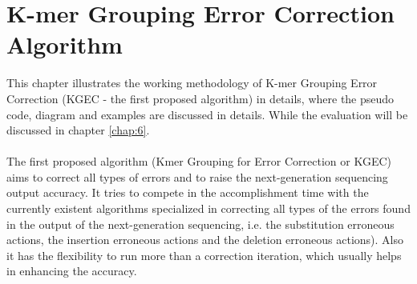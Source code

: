 \documentclass[12pt,openany]{llncs}
\begin{document}
\newpage
\chapter{\label{chap:4}K-mer Grouping Error Correction Algorithm}
This chapter illustrates the working methodology of K-mer Grouping Error Correction (KGEC - the first proposed algorithm) in details, where the pseudo code, diagram and examples are discussed in details. While the evaluation will be discussed in chapter \ref{chap:6}.
\\
\\
The first proposed algorithm (Kmer Grouping for Error Correction or KGEC) aims to correct all types of errors and to raise the next-generation sequencing output accuracy. It tries to compete in the accomplishment time with the currently existent algorithms specialized in correcting all types of the errors found in the output of the next-generation sequencing, i.e. the substitution erroneous actions, the insertion erroneous actions and the deletion erroneous actions). Also it has the flexibility to run more than a correction iteration, which usually helps in enhancing the accuracy.
\end{document}

